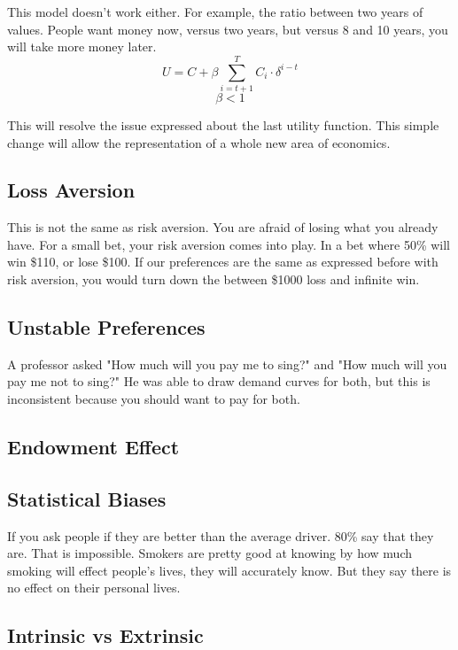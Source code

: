 \documentclass{article}
\begin{document}
This model doesn't work either. For example, the ratio between two years
of values. People want money now, versus two years, but versus 8 and 10 years,
you will take more money later.
$$ U = C + \beta \sum_{i = t + 1}^{T} C_{i} \cdot \delta^{i - t} $$
$$ \beta < 1 $$

This will resolve the issue expressed about the last utility function. This
simple change will allow the representation of a whole new area of economics.

\subsection{Loss Aversion}

This is not the same as risk aversion. You are afraid of losing what you already
have. For a small bet, your risk aversion comes into play. In a bet where 50\%
will win \$110, or lose \$100. If our preferences are the same as expressed
before with risk aversion, you would turn down the between \$1000 loss and
infinite win. 

\subsection{Unstable Preferences} 

A professor asked "How much will you pay me to sing?" and "How much will you pay
me not to sing?" He was able to draw demand curves for both, but this is
inconsistent because you should want to pay for both.

\subsection{Endowment Effect} 

\subsection{Statistical Biases} 

If you ask people if they are better than the average driver. 80\% say that they
are. That is impossible. Smokers are pretty good at knowing by how much smoking
will effect people's lives, they will accurately know. But they say there is no
effect on their personal lives.

\subsection{Intrinsic vs Extrinsic}
\end{document}
